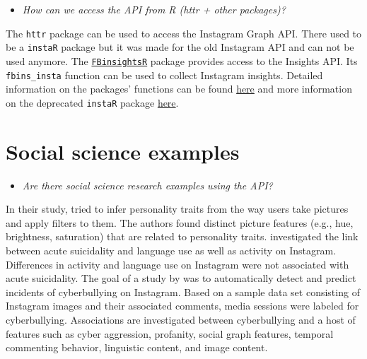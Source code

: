 \documentclass[
]{book}
\providecommand{\tightlist}{%
  \setlength{\itemsep}{0pt}\setlength{\parskip}{0pt}}
\begin{document}
\begin{itemize}
\tightlist
\item
  \emph{How can we access the API from R (httr + other packages)?}
\end{itemize}

The \texttt{httr} package can be used to access the Instagram Graph API. There used to be a \texttt{instaR} package but it was made for the old Instagram API and can not be used anymore. The \href{\%22https://rdrr.io/github/Deducive/FBinsightsR/\%22}{\texttt{FBinsightsR}} package provides access to the Insights API. Its \texttt{fbins\_insta} function can be used to collect Instagram insights. Detailed information on the packages' functions can be found \href{\%22https://github.com/Deducive/FBinsightsR/blob/master/R/functions.R\%22}{here} and more information on the deprecated \texttt{instaR} package \href{\%22https://stackoverflow.com/questions/54488186/instagram-api-in-r-deprecated-need-to-use-graph-facebook-com\%22}{here}.

\hypertarget{social-science-examples-5}{%
\section{Social science examples}\label{social-science-examples-5}}

\begin{itemize}
\tightlist
\item
  \emph{Are there social science research examples using the API?}
\end{itemize}

In their study, \citet{Ferwerda2015-db} tried to infer personality traits from the way users take pictures and apply filters to them. The authors found distinct picture features (e.g., hue, brightness, saturation) that are related to personality traits. \citet{Brown2019-jp} investigated the link between acute suicidality and language use as well as activity on Instagram. Differences in activity and language use on Instagram were not associated with acute suicidality. The goal of a study by \citet{Hosseinmardi2015-yc} was to automatically detect and predict incidents of cyberbullying on Instagram. Based on a sample data set consisting of Instagram images and their associated comments, media sessions were labeled for cyberbullying. Associations are investigated between cyberbullying and a host of features such as cyber aggression, profanity, social graph features, temporal commenting behavior, linguistic content, and image content.
\end{document}
